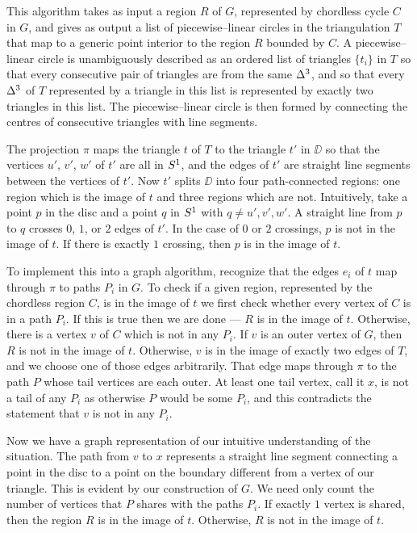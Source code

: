 \label{alg:trilist}

This algorithm takes as input a region $R$ of $G$, represented by chordless cycle $C$ in $G$, and gives as output a list of piecewise--linear circles in the triangulation $T$ that map to a generic point interior to the region $R$ bounded by $C$.
A piecewise--linear circle is unambiguously described as an ordered list of triangles $\{t_i\}$ in $T$ so that every consecutive pair of triangles are from the same $\Delta^3$, and so that every $\Delta^3$ of $T$ represented by a triangle in this list is represented by exactly two triangles in this list.
The piecewise--linear circle is then formed by connecting the centres of consecutive triangles with line segments.

The projection $\pi$ maps the triangle $t$ of $T$ to the triangle $t'$ in $\DD$ so that the vertices $u'$, $v'$, $w'$ of $t'$ are all in $S^1$, and the edges of $t'$ are straight line segments between the vertices of $t'$.
Now $t'$ splits $\DD$ into four path-connected regions: one region which is the image of $t$ and three regions which are not.
Intuitively, take a point $p$ in the disc and a point $q$ in $S^1$ with $q\neq u',v',w'$.
A straight line from $p$ to $q$ crosses $0$, $1$, or $2$ edges of $t'$.
In the case of $0$ or $2$ crossings, $p$ is not in the image of $t$.
If there is exactly $1$ crossing, then $p$ is in the image of $t$.

To implement this into a graph algorithm, recognize that the edges $e_i$ of $t$ map through $\pi$ to paths $P_i$ in $G$.
To check if a given region, represented by the chordless region $C$, is in the image of $t$ we first check whether every vertex of $C$ is in a path $P_i$.
If this is true then we are done --- $R$ is in the image of $t$.
Otherwise, there is a vertex $v$ of $C$ which is not in any $P_i$.
If $v$ is an outer vertex of $G$, then $R$ is not in the image of $t$.
Otherwise, $v$ is in the image of exactly two edges of $T$, and we choose one of those edges arbitrarily.
That edge maps through $\pi$ to the path $P$ whose tail vertices are each outer.
At least one tail vertex, call it $x$, is not a tail of any $P_i$ as otherwise $P$ would be some $P_i$, and this contradicts the statement that $v$ is not in any $P_i$.

Now we have a graph representation of our intuitive understanding of the situation.
The path from $v$ to $x$ represents a straight line segment connecting a point in the disc to a point on the boundary different from a vertex of our triangle.
This is evident by our construction of $G$.
We need only count the number of vertices that $P$ shares with the paths $P_i$.
If exactly $1$ vertex is shared, then the region $R$ is in the image of $t$.
Otherwise, $R$ is not in the image of $t$.
